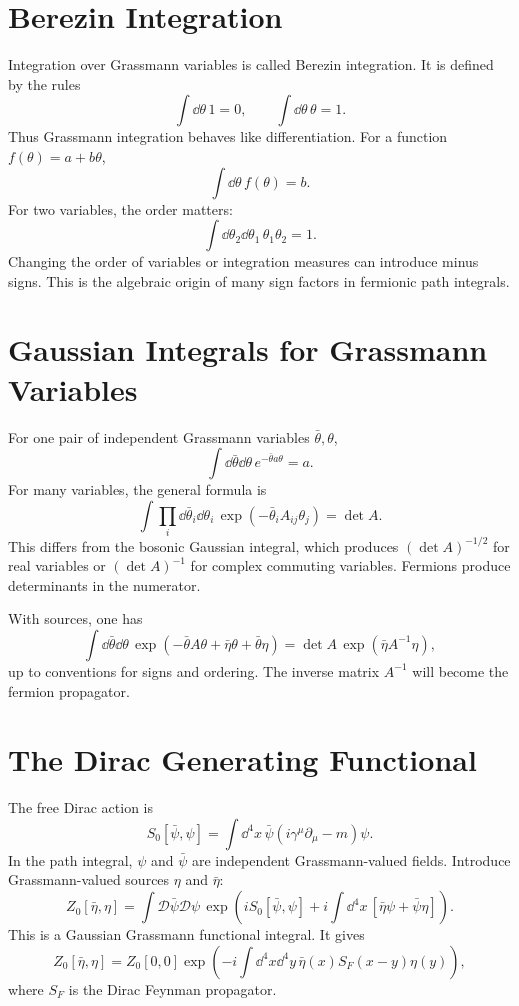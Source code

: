 \section{Berezin Integration}

Integration over Grassmann variables is called Berezin integration. It is defined
by the rules
\[
    \int\dd\theta\,1=0,
    \qquad
    \int\dd\theta\,\theta=1.
\]
Thus Grassmann integration behaves like differentiation. For a function
\(f(\theta)=a+b\theta\),
\[
    \int\dd\theta\,f(\theta)=b.
\]
For two variables, the order matters:
\[
    \int\dd\theta_2\dd\theta_1\,\theta_1\theta_2=1.
\]
Changing the order of variables or integration measures can introduce minus
signs. This is the algebraic origin of many sign factors in fermionic path
integrals.

\section{Gaussian Integrals for Grassmann Variables}

For one pair of independent Grassmann variables \(\bar\theta,\theta\),
\[
    \int\dd\bar\theta\dd\theta\,
    e^{-\bar\theta a\theta}=a.
\]
For many variables, the general formula is
\[
    \int\prod_i\dd\bar\theta_i\dd\theta_i\,
    \exp\left(-\bar\theta_i A_{ij}\theta_j\right)
    = \det A.
\]
This differs from the bosonic Gaussian integral, which produces
\((\det A)^{-1/2}\) for real variables or \((\det A)^{-1}\) for complex
commuting variables. Fermions produce determinants in the numerator.

With sources, one has
\[
    \int\dd\bar\theta\dd\theta\,
    \exp\left(-\bar\theta A\theta+\bar\eta\theta+\bar\theta\eta\right)
    = \det A\,\exp\left(\bar\eta A^{-1}\eta\right),
\]
up to conventions for signs and ordering. The inverse matrix \(A^{-1}\) will
become the fermion propagator.

\section{The Dirac Generating Functional}

The free Dirac action is
\[
    S_0[\bar\psi,\psi]
    = \int\dd^4x\,\bar\psi(i\gamma^\mu\partial_\mu-m)\psi.
\]
In the path integral, \(\psi\) and \(\bar\psi\) are independent Grassmann-valued
fields. Introduce Grassmann-valued sources \(\eta\) and \(\bar\eta\):
\[
    Z_0[\bar\eta,\eta]
    = \int\mathcal{D}\bar\psi\mathcal{D}\psi\,
      \exp\left(iS_0[\bar\psi,\psi]
      +i\int\dd^4x\,[\bar\eta\psi+\bar\psi\eta]\right).
\]
This is a Gaussian Grassmann functional integral. It gives
\[
    Z_0[\bar\eta,\eta]
    = Z_0[0,0]\exp\left(
        -i\int\dd^4x\dd^4y\,
        \bar\eta(x)S_F(x-y)\eta(y)
      \right),
\]
where \(S_F\) is the Dirac Feynman propagator.

